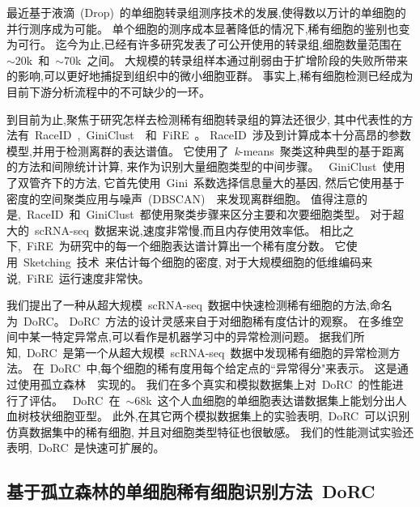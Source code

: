 最近基于液滴~(Drop)~的单细胞转录组测序技术的发展,使得数以万计的单细胞的并行测序成为可能。
单个细胞的测序成本显著降低的情况下,稀有细胞的鉴别也变为可行。
迄今为止,已经有许多研究发表了可公开使用的转录组,细胞数量范围在~${\sim} 20$k~和~${\sim} 70$k~之间。
大规模的转录组样本通过削弱由于扩增阶段的失败所带来的影响,可以更好地捕捉到组织中的微小细胞亚群。
事实上,稀有细胞检测已经成为目前下游分析流程中的不可缺少的一环。

到目前为止,聚焦于研究怎样去检测稀有细胞转录组的算法还很少,
其中代表性的方法有~RaceID~\cite{grun2015single},~GiniClust~\cite{jiang2016giniclust}~和~FiRE~\cite{jindal2018discovery}。
RaceID~涉及到计算成本十分高昂的参数模型,并用于检测离群的表达谱值。
它使用了~\textit{k}-means~聚类这种典型的基于距离的方法和间隙统计计算,
来作为识别大量细胞类型的中间步骤。
~GiniClust~使用了双管齐下的方法,
它首先使用~Gini~系数选择信息量大的基因,
然后它使用基于密度的空间聚类应用与噪声~(DBSCAN)~\cite{ester1996density}~来发现离群细胞。
值得注意的是,~RaceID~和~GiniClust~都使用聚类步骤来区分主要和次要细胞类型。
对于超大的~scRNA-seq~数据来说,速度非常慢,而且内存使用效率低。
相比之下,~FiRE~为研究中的每一个细胞表达谱计算出一个稀有度分数。
它使用~Sketching~技术~\cite{wang2007sizing}来估计每个细胞的密度,
对于大规模细胞的低维编码来说,~FiRE~运行速度非常快。

我们提出了一种从超大规模~scRNA-seq~数据中快速检测稀有细胞的方法,命名为~DoRC。
DoRC~方法的设计灵感来自于对细胞稀有度估计的观察。
在多维空间中某一特定异常点,可以看作是机器学习中的异常检测问题。
据我们所知,~DoRC~是第一个从超大规模~scRNA-seq~数据中发现稀有细胞的异常检测方法。
在~DoRC~中,每个细胞的稀有度用每个给定点的``异常得分"来表示。
这是通过使用孤立森林~\cite{liu2008isolation}~实现的。
我们在多个真实和模拟数据集上对~DoRC~的性能进行了评估。
~DoRC~在~${\sim}68$k~这个人血细胞的单细胞表达谱数据集上能划分出人血树枝状细胞亚型。
此外,在其它两个模拟数据集上的实验表明,~DoRC~可以识别仿真数据集中的稀有细胞,
并且对细胞类型特征也很敏感。
我们的性能测试实验还表明,~DoRC~是快速可扩展的。

\subsection{基于孤立森林的单细胞稀有细胞识别方法~DoRC}
\label{sec:method}


